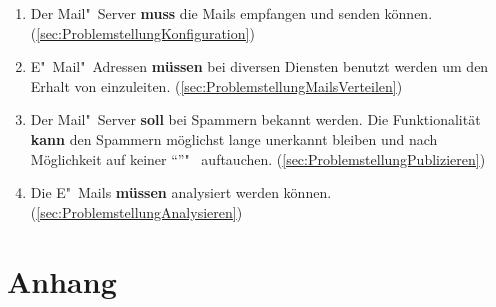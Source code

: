 \documentclass[a4paper,11pt,singlespacing]{article}
\begin{document}
	\begin{enumerate}
	\item Der Mail"~Server \textbf{muss} die Mails empfangen und senden können. (\autoref{sec:ProblemstellungKonfiguration})
	\item E"~Mail"~Adressen \textbf{müssen} bei diversen Diensten benutzt werden um den Erhalt von  einzuleiten. (\autoref{sec:ProblemstellungMailsVerteilen})
	\item Der Mail"~Server \textbf{soll} bei Spammern bekannt werden. Die  Funktionalität \textbf{kann} den Spammern möglichst lange unerkannt bleiben und nach Möglichkeit auf keiner "`"'"~ auftauchen. (\autoref{sec:ProblemstellungPublizieren})
	\item Die E"~Mails \textbf{müssen} analysiert werden können. (\autoref{sec:ProblemstellungAnalysieren})
	\end{enumerate}


%
%
%
%
%
%


\newpage




\listoffigures
{}

\lstlistoflistings
{}

\newpage

\section*{Anhang}\label{Anhang}

%
\end{document}
